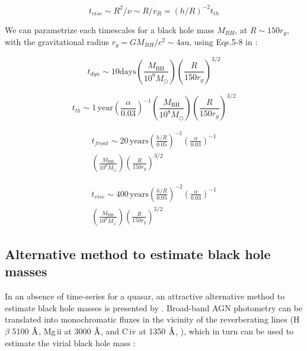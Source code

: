 \documentclass[twocolumn]{aastex62}
\let\oldAA\AA
\renewcommand{\AA}{\text{\normalfont\oldAA}}
\begin{document}
\begin{equation}
t_{visc} \sim R^{2} / \nu \sim  R / v_{R} = (h/R)^{-2} t_{th}
\end{equation}

 We can parametrize each timescales for a black hole mass $M_{BH}$, at $R \sim 150 r_{g}$, with the gravitational radius $r_{g} = GM_{BH} / c^{2} \sim 4 \mathrm{au}$, using Eqs.5-8 in \cite{stern2018} : 


 \begin{equation}
 t_{dyn} \sim 10  \mathrm{days} \left(\frac{M_{\mathrm{BH}}}{10^{8} M_{\odot}} \right) 
 \left( \frac{R}{150 r_{g}}\right) ^{3/2} 
 \end{equation}

 \begin{equation}
 t_{th}   \sim 1 \,\mathrm{year} \left( \frac{\alpha}{0.03}\right)^{-1}  
 \left( \frac{M_{\mathrm{BH}}}{10^{8} M_{\odot}}\right) \left( \frac{R}{150 r_{g}}\right)^{3/2} 
 \end{equation}

  \begin{eqnarray}
  t_{front} \sim 20 \,\mathrm{years} \left( \frac{h/R}{0.05}\right)^{-1}   \left( \frac{\alpha}{0.03}\right)^{-1}  \nonumber  \\ 
  \left( \frac{M_{\mathrm{BH}}}{10^{8} M_{\odot}}\right)     \left( \frac{R}{150 r_{g}}\right) ^{3/2} 
 \end{eqnarray}

  \begin{eqnarray}
  t_{visc}  \sim 400 \, \mathrm{years} \left( \frac{h/R}{0.05}\right)^{-2}   \left( \frac{\alpha}{0.03}\right)^{-1} \nonumber  \\  
  \left(\frac{M_{\mathrm{BH}}}{10^{8} M_{\odot}} \right)     \left( \frac{R}{150 r_{g}}\right) ^{3/2}  
 \end{eqnarray}






\subsection{Alternative method to estimate black hole masses}

In an absence of time-series for a quasar, an attractive alternative method to estimate black hole masses is presented by \citep{kozlowski2015}. Broad-band AGN photometry can be translated into monochromatic fluxes in the vicinity of the reverberating lines (H$\beta$ 5100 $\mbox{\AA}$, Mg\,{\sc ii} at 3000 $\mbox{\AA}$, and C\,{\sc iv} at 1350 $\mbox{\AA}$, \citealt{kozlowski2015}), which in turn can be used to estimate the virial black hole mass :
\end{document}
